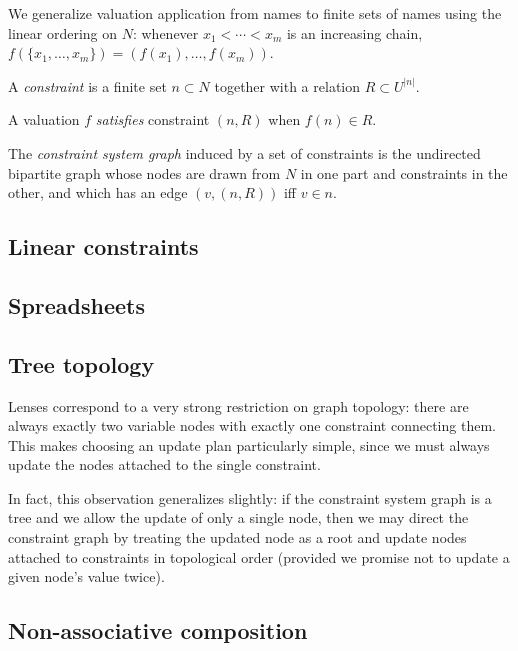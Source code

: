 We generalize valuation application from names to finite sets of names using
the linear ordering on $N$: whenever $x_1 < \cdots < x_m$ is an increasing
chain, $f(\{x_1,\ldots,x_m\}) = (f(x_1),\ldots,f(x_m))$.

\begin{definition}
    A \emph{constraint} is a finite set $n \subset N$ together with a relation $R
    \subset U^{|n|}$.
\end{definition}

\begin{definition}
    A valuation $f$ \emph{satisfies} constraint $(n,R)$ when $f(n) \in R$.
\end{definition}

\begin{definition}
    The \emph{constraint system graph} induced by a set of constraints is
    the undirected bipartite graph whose nodes are drawn from $N$ in one
    part and constraints in the other, and which has an edge $(v,(n,R))$ iff
    $v \in n$.
\end{definition}

\subsection{Linear constraints}

\subsection{Spreadsheets}

\subsection{Tree topology}

Lenses correspond to a very strong restriction on graph topology: there are
always exactly two variable nodes with exactly one constraint connecting
them. This makes choosing an update plan particularly simple, since we must
always update the nodes attached to the single constraint.

In fact, this observation generalizes slightly: if the constraint system
graph is a tree and we allow the update of only a single node, then we may
direct the constraint graph by treating the updated node as a root and
update nodes attached to constraints in topological order (provided we
promise not to update a given node's value twice).

\subsection{Non-associative composition}

